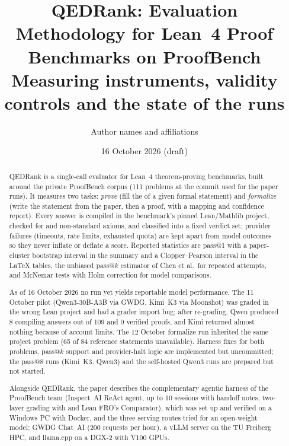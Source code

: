 \documentclass[11pt,a4paper]{article}
\title{QEDRank: Evaluation Methodology for Lean~4 Proof Benchmarks on ProofBench\\[4pt]
  \large Measuring instruments, validity controls and the state of the runs}
\author{Author names and affiliations}
\date{16 October 2026 (draft)}
\begin{document}
\maketitle

\begin{abstract}
QEDRank is a single-call evaluator for Lean~4 theorem-proving benchmarks, built around the private ProofBench corpus (111 problems at the commit used for the paper runs). It measures two tasks: \emph{prove} (fill the  of a given formal statement) and \emph{formalize} (write the statement from the paper, then a proof, with a mapping and confidence report). Every answer is compiled in the benchmark's pinned Lean/Mathlib project, checked for  and non-standard axioms, and classified into a fixed verdict set; provider failures (timeouts, rate limits, exhausted quota) are kept apart from model outcomes so they never inflate or deflate a score. Reported statistics are pass@1 with a paper-cluster bootstrap interval in the summary and a Clopper--Pearson interval in the LaTeX tables, the unbiased pass@$k$ estimator of Chen et al.\ for repeated attempts, and McNemar tests with Holm correction for model comparisons.

As of 16 October 2026 no run yet yields reportable model performance. The 11 October pilot (Qwen3-30B-A3B via GWDG, Kimi~K3 via Moonshot) was graded in the wrong Lean project and had a grader import bug; after re-grading, Qwen produced 8 compiling answers out of 109 and 0 verified proofs, and Kimi returned almost nothing because of account limits. The 12 October formalize run inherited the same project problem (65 of 84 reference statements unavailable). Harness fixes for both problems, pass@$k$ support and provider-halt logic are implemented but uncommitted; the pass@8 runs (Kimi~K3, Qwen3) and the self-hosted Qwen3 runs are prepared but not started.

Alongside QEDRank, the paper describes the complementary agentic harness of the ProofBench team (Inspect~AI ReAct agent, up to 10 sessions with handoff notes, two-layer grading with  and Lean FRO's Comparator), which was set up and verified on a Windows PC with Docker, and the three serving routes tried for an open-weight model: GWDG Chat~AI (200 requests per hour), a vLLM server on the TU Freiberg HPC, and llama.cpp on a DGX-2 with V100 GPUs.
\end{abstract}

\tableofcontents

\end{document}

